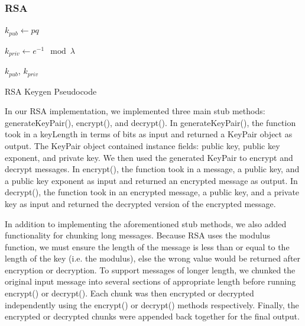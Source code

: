 \documentclass[acmlarge]{acmart}
\begin{document}
\subsubsection{RSA}\label{sec:rsa}
\begin{algorithm}[tbh]
\SetAlgoNoLine
{}


$k_{pub} \longleftarrow pq$

$k_{priv} \longleftarrow e^{-1} \mod{\lambda}$

\KwRet $k_{pub}$, $k_{priv}$
\caption{RSA Keygen Pseudocode \cite{RSA}}
\label{alg:rsa-keygen}
\end{algorithm}

In our RSA implementation, we implemented three main stub methods: generateKeyPair(), encrypt(), and decrypt(). In generateKeyPair(), the function took in a keyLength in terms of bits as input and returned a KeyPair object as output. The KeyPair object contained instance fields: public key, public key exponent, and private key. We then used the generated KeyPair to encrypt and decrypt messages. In encrypt(), the function took in a message, a public key, and a public key exponent as input and returned an encrypted message as output. In decrypt(), the function took in an encrypted message, a public key, and a private key as input and returned the decrypted version of the encrypted message.

In addition to implementing the aforementioned stub methods, we also added functionality for chunking long messages. Because RSA uses the modulus function, we must ensure the length of the message is less than or equal to the length of the key (i.e. the modulus), else the wrong value would be returned after encryption or decryption. To support messages of longer length, we chunked the original input message into several sections of appropriate length before running encrypt() or decrypt(). Each chunk was then encrypted or decrypted independently using the encrypt() or decrypt() methods respectively. Finally, the encrypted or decrypted chunks were appended back together for the final output.
\end{document}
